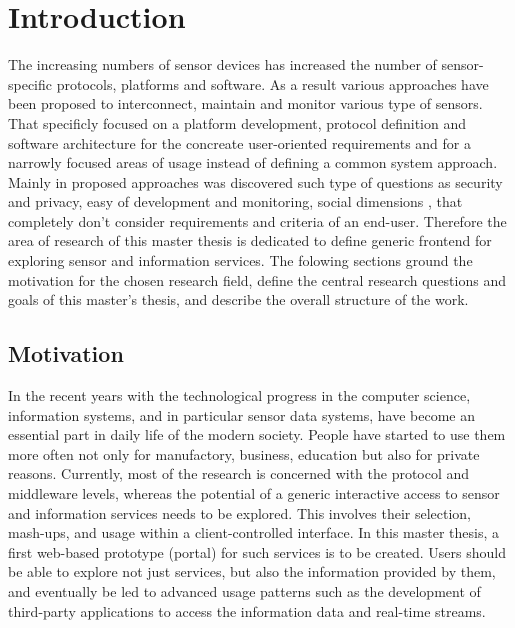 
\chapter{Introduction}

  \begin{singlespace}
     The increasing numbers of sensor devices has increased the number of sensor-specific protocols, platforms and software. As a result various approaches have been proposed to interconnect, maintain and monitor various type of sensors\cite{6588063,bendel2013service,song2010real}. That specificly focused on a platform development, protocol definition and software architecture for the concreate user-oriented requirements and for a narrowly focused areas of usage instead of defining a common system approach. Mainly in proposed approaches was discovered such type of questions as security and privacy, easy of development and monitoring, social dimensions \cite{eggert2013sensorcloud}, that completely don't consider requirements and criteria of an end-user. Therefore the area of research of this master thesis is dedicated to define generic frontend for exploring sensor and information services.
     The folowing sections ground the motivation for the chosen research field, define the central research questions and goals of this master's thesis, and describe the overall structure of the work.
  \end{singlespace}

\section{Motivation}
     In the recent years with the technological progress in the computer science, information systems, and in particular sensor data systems, have become an essential part in daily life of the modern society. People have started to use them more often not only for manufactory, business, education but also for private reasons.
     Currently, most of the research is concerned with the protocol and middleware levels, whereas
     the potential of a generic interactive access to sensor and information services needs to be explored. 
     This involves their selection, mash-ups, and usage within a client-controlled interface.
     In this master thesis, a first web-based prototype (portal) for such services is to be
     created. Users should be able to explore not just services, but also the information provided by
     them, and eventually be led to advanced usage patterns such as the development
     of third-party applications to access the information data and real-time streams.

